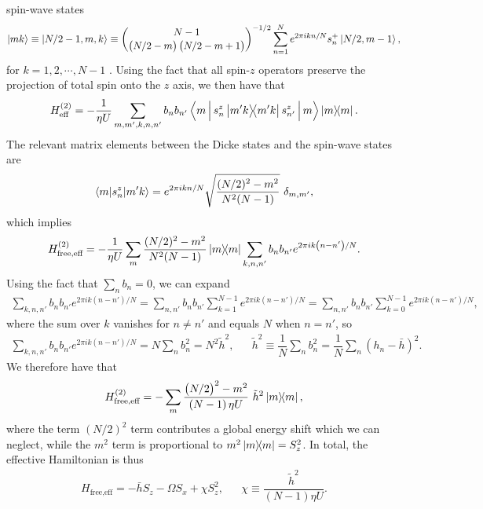 \documentclass[aps,notitlepage,nofootinbib,11pt]{revtex4-1}
\renewcommand{\t}{\text} %
\newcommand{\f}[2]{\dfrac{#1}{#2}} %
\newcommand{\p}[1]{\left(#1\right)} %
\newcommand{\bk}{\braket} %
\newcommand{\Bk}{\Braket} %
\newcommand{\1}{\mathds{1}}
\begin{document}
spin-wave states
\begin{align}
  \ket{mk}
  \equiv \ket{N/2-1,m,k}
  \equiv {N-1 \choose \p{N/2-m}\p{N/2-m+1}}^{-1/2}
  \sum_{n=1}^N e^{2\pi ikn/N} s_n^+ \ket{N/2,m-1},
\end{align}
for $k=1,2,\cdots,N-1$ \cite{swallows2011suppression}.  Using the fact that all spin-$z$ operators preserve the projection of total spin onto the $z$ axis, we then have that
\begin{align}
  H_{\t{eff}}^{(2)}
  = -\f1{\eta U} \sum_{m,m',k,n,n'} b_n b_{n'}
  \Bk{m| s_n^z \op{m'k} s_{n'}^z |m} \op{m}.
  \label{eq:general_H_eff_2}
\end{align}
The relevant matrix elements between the Dicke states and the
spin-wave states are \cite{swallows2011suppression}
\begin{align}
  \bk{m|s_n^z|m'k}
  = e^{2\pi i k n/N} \sqrt{\f{(N/2)^2-m^2}{N^2 (N-1)}}~ \delta_{m,m'},
\end{align}
which implies
\begin{align}
  H_{\t{free,eff}}^{(2)}
  = -\f1{\eta U} \sum_m \f{(N/2)^2-m^2}{N^2 (N-1)} \op{m}
  \sum_{k,n,n'} b_n b_{n'} e^{2\pi ik\p{n-n'}/N}.
\end{align}
Using the fact that $\sum_nb_n=0$, we can expand
\begin{align}
  \sum_{k,n,n'} b_n b_{n'} e^{2\pi ik\p{n-n'}/N}
  = \sum_{n,n'} b_n b_{n'} \sum_{k=1}^{N-1} e^{2\pi ik\p{n-n'}/N}
  = \sum_{n,n'} b_n b_{n'} \sum_{k=0}^{N-1} e^{2\pi ik\p{n-n'}/N},
\end{align}
where the sum over $k$ vanishes for $n\ne n'$ and equals $N$ when
$n=n'$, so
\begin{align}
  \sum_{k,n,n'} b_n b_{n'} e^{2\pi ik\p{n-n'}/N}
  = N \sum_n b_n^2 = N^2 \tilde h^2,
  &&
  \tilde h^2 \equiv \f1N \sum_n b_n^2 = \f1N \sum_n \p{h_n - \bar h}^2.
  \label{eq:sum_knn}
\end{align}
We therefore have that
\begin{align}
  H_{\t{free,eff}}^{(2)}
  = -\sum_m \f{\p{N/2}^2-m^2}{\p{N-1}\eta U}~ \tilde h^2 \op{m},
\end{align}
where the term $\p{N/2}^2$ term contributes a global energy shift
which we can neglect, while the $m^2$ term is proportional to
$m^2\op{m}=S_z^2$.  In total, the effective Hamiltonian is thus
\begin{align}
  H_{\t{free,eff}} = - \bar h S_z - \Omega S_x + \chi S_z^2,
  &&
  \chi \equiv \f{\tilde h^2}{\p{N-1}\eta U}.
\end{align}


\end{document}
